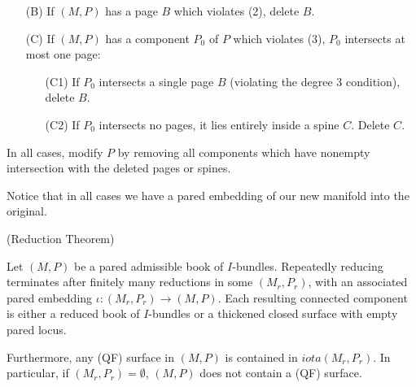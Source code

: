 \begin{defn}
\begin{enumerate}
\item[(B)] If $(M,P)$ has a page $B$ which violates (2), delete $B$.

\item[(C)] If $(M,P)$ has a component $P_0$ of $P$ which violates (3), $P_0$
intersects at most one page:

\begin{enumerate}

\item[(C1)] If $P_0$ intersects a single page $B$ (violating the degree
3 condition), delete $B$.

\item[(C2)] If $P_0$ intersects no pages, it lies entirely inside a spine $C$.
Delete $C$.

\end{enumerate}

\end{enumerate}

In all cases, modify $P$ by removing all components which have nonempty
intersection with the deleted pages or spines.

\end{defn}

Notice that in all cases we have a pared embedding of our new manifold into the
original.

\begin{thm}(Reduction Theorem)

Let $(M,P)$ be a pared admissible book of $I$-bundles. Repeatedly reducing
terminates after finitely many reductions in some $(M_r,P_r)$, with an associated
pared embedding $\iota\colon (M_r,P_r) \to (M,P)$. Each resulting connected
component is either a reduced book of $I$-bundles or a thickened closed surface
with empty pared locus.

Furthermore, any (QF) surface in $(M,P)$ is contained in $iota(M_r,P_r)$. In
particular, if $(M_r,P_r)=\emptyset$, $(M,P)$ does not contain a (QF) surface.

\end{thm}

